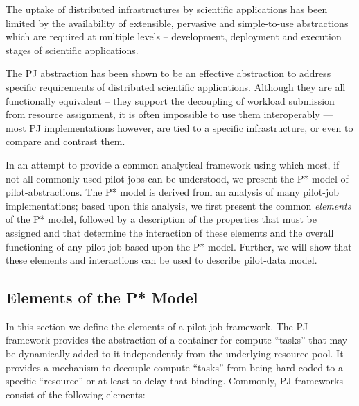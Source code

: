 \documentclass[conference,final]{IEEEtran}
\newcommand{\upp}{\vspace*{-0.5em}}
\begin{document}

The uptake of distributed infrastructures by scientific
applications has been limited by the availability of extensible,
pervasive and simple-to-use abstractions which are required at
multiple levels – development, deployment and execution stages of
scientific applications.


The PJ abstraction has been shown to be an effective
abstraction to address specific requirements of distributed scientific
applications. Although they are all functionally equivalent -- they
support the decoupling of workload submission from resource
assignment, it is often impossible to use them interoperably --- most
PJ implementations however, are tied to a specific
infrastructure, or even to compare and contrast them.

In an attempt to provide a common analytical framework using which
most, if not all commonly used pilot-jobs can be understood, we
present the P* model of pilot-abstractions. The P* model is derived
from an analysis of many pilot-job implementations; based upon this analysis, we
first present the common {\it elements} of the P* model, followed by
a description of the properties that must be assigned and that
determine the interaction of these elements and the overall
functioning of any pilot-job based upon the P* model. Further, we will show
that these elements and interactions can be used to describe pilot-data
model.

\subsection{Elements of the P* Model \upp\upp}

In this section we define the elements of a pilot-job framework. The PJ
framework provides the abstraction of a container for compute ``tasks''
that may be dynamically added to it independently from the underlying resource
pool. It provides a mechanism to decouple compute ``tasks'' from being
hard-coded to a specific ``resource'' or at least to delay that binding. Commonly, PJ 
frameworks consist of the following elements:
\end{document}
